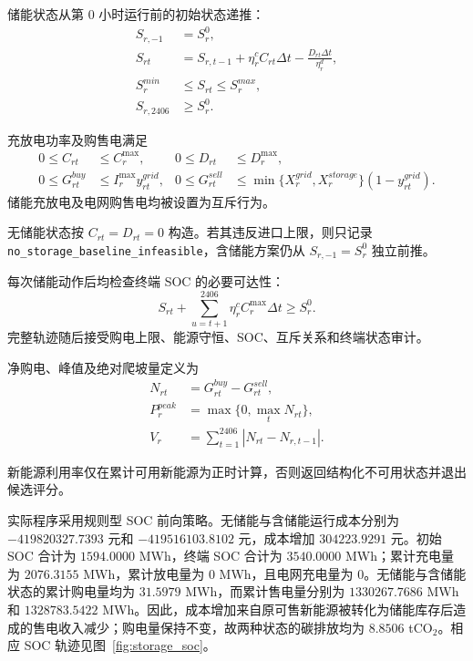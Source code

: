储能状态从第 $0$ 小时运行前的初始状态递推：
\begin{align}
S_{r,-1}&=S_r^0,\\
S_{rt}&=S_{r,t-1}+\eta_r^cC_{rt}\Delta t
-\frac{D_{rt}\Delta t}{\eta_r^d},\\
S_r^{min}&\le S_{rt}\le S_r^{max},\\
S_{r,2406}&\ge S_r^0.
\end{align}

充放电功率及购售电满足
\begin{align}
0\le C_{rt}&\le C_r^{\max},&
0\le D_{rt}&\le D_r^{\max},\\
0\le G_{rt}^{buy}&\le I_r^{\max}y_{rt}^{grid},&
0\le G_{rt}^{sell}
&\le\min\{X_r^{grid},X_r^{storage}\}(1-y_{rt}^{grid}).
\end{align}
储能充放电及电网购售电均被设置为互斥行为。

无储能状态按 $C_{rt}=D_{rt}=0$ 构造。若其违反进口上限，则只记录 \texttt{no\_storage\_\allowbreak baseline\_\allowbreak infeasible}，含储能方案仍从 $S_{r,-1}=S_r^0$ 独立前推。

每次储能动作后均检查终端 SOC 的必要可达性：
\begin{equation}
S_{rt}+\sum_{u=t+1}^{2406}\eta_r^cC_r^{\max}\Delta t\ge S_r^0.
\end{equation}
完整轨迹随后接受购电上限、能源守恒、SOC、互斥关系和终端状态审计。

净购电、峰值及绝对爬坡量定义为
\begin{align}
N_{rt}&=G_{rt}^{buy}-G_{rt}^{sell},\\
P_r^{peak}&=\max\{0,\max_tN_{rt}\},\\
V_r&=\sum_{t=1}^{2406}|N_{rt}-N_{r,t-1}|.
\end{align}

新能源利用率仅在累计可用新能源为正时计算，否则返回结构化不可用状态并退出候选评分。

实际程序采用规则型 SOC 前向策略。无储能与含储能运行成本分别为 $-419820327.7393$ 元和 $-419516103.8102$ 元，成本增加 $304223.9291$ 元。初始 SOC 合计为 $1594.0000$ MWh，终端 SOC 合计为 $3540.0000$ MWh；累计充电量为 $2076.3155$ MWh，累计放电量为 $0$ MWh，且电网充电量为 $0$。无储能与含储能状态的累计购电量均为 $31.5979$ MWh，而累计售电量分别为 $1330267.7686$ MWh 和 $1328783.5422$ MWh。因此，成本增加来自原可售新能源被转化为储能库存后造成的售电收入减少；购电量保持不变，故两种状态的碳排放均为 $8.8506$ tCO$_2$。相应 SOC 轨迹见图~\ref{fig:storage_soc}。

